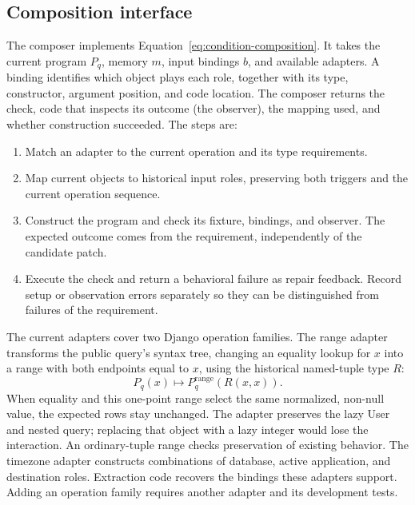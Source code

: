 \subsection{Composition interface}
The composer implements Equation~\ref{eq:condition-composition}. It takes the
current program $P_q$, memory $m$, input bindings $b$, and available adapters.
A binding identifies which object plays each role, together with its type,
constructor, argument position, and code location. The composer returns the
check, code that inspects its outcome (the observer), the mapping used, and
whether construction succeeded.
The steps are:
\begin{enumerate}
\item Match an adapter to the current operation and its type requirements.
\item Map current objects to historical input roles, preserving both triggers
and the current operation sequence.
\item Construct the program and check its fixture, bindings, and observer.
The expected outcome comes from the requirement, independently of the candidate patch.
\item Execute the check and return a behavioral failure as repair feedback.
Record setup or observation errors separately so they can be distinguished
from failures of the requirement.
\end{enumerate}

The current adapters cover two Django operation families. The range adapter
transforms the public query's syntax tree, changing an equality lookup for
$x$ into a range with both endpoints equal to $x$, using the historical
named-tuple type $R$:
\begin{equation}
 P_q(x)\longmapsto P_q^{\mathrm{range}}(R(x,x)).
 \label{eq:composition}
\end{equation}
When equality and this one-point range select the same normalized, non-null
value, the expected rows stay unchanged. The adapter preserves the lazy User
and nested query; replacing that object with a lazy integer would lose the
interaction. An ordinary-tuple range checks preservation of existing behavior.
The timezone adapter constructs combinations of database, active application,
and destination roles. Extraction code recovers the bindings these adapters
support. Adding an operation family requires another adapter and its
development tests.
